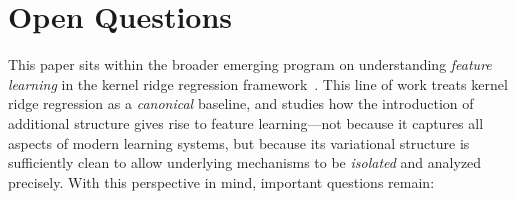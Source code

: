 \documentclass[sn-mathphys-num]{sn-jnl}%
\numberwithin{equation}{section}
\theoremstyle{thmstyleone}%
\theoremstyle{thmstyletwo}%
\theoremstyle{thmstylethree}%
\begin{document}
\section{Open Questions} 
\label{sec:open-questions}
\indent\indent
This paper sits within the broader emerging program on understanding \emph{feature learning} in
the kernel ridge regression framework~\cite{FukumizuBaJo04, FukumizuBaJo09, Adit24A, FollainBa24, RadhakrishnanBeDr25, HuangLaDePoRo25, ZhuDaDrFa25, LiRu25, LiRub25, RuanLiJo25}.  This line of work treats kernel ridge regression as a \emph{canonical} baseline, and studies how the introduction of additional structure gives rise to feature learning---not because it captures all aspects of modern learning systems, but because its variational structure is sufficiently clean to allow underlying mechanisms to be \emph{isolated} and analyzed precisely. With this perspective in mind, important questions remain:
\end{document}

